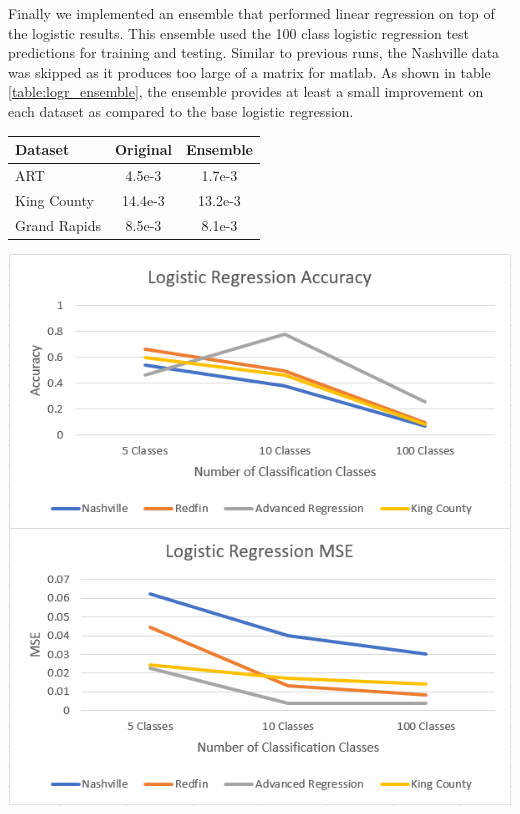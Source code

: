 \documentclass[10pt]{article}
\begin{document}
\begin{multicols}{2}
		Finally we implemented an ensemble that performed linear regression on top of the logistic results. This ensemble used the 100 class logistic regression test predictions for training and testing. Similar to previous runs, the Nashville data was skipped as it produces too large of a matrix for matlab. As shown in table \ref{table:logr_ensemble}, the ensemble provides at least a small improvement on each dataset as compared to the base logistic regression.

		\begin{center}
		\captionsetup{type=table}
		\begin{tabular}{l|c|c}
			Dataset			& Original & Ensemble \\
			\hline
			ART 			& 4.5e-3	& 1.7e-3 \\
			King County 	& 14.4e-3 	& 13.2e-3 \\
			Grand Rapids	& 8.5e-3 	& 8.1e-3 \\
		\end{tabular}
		\label{table:logr_ensemble}
		\end{center}

		\begin{center}
	        \captionsetup{type=figure}
			\includegraphics[scale=0.6]{Images/LogisticRegressionMSEAccuracy} \\
			\label{fig:logr_MSE_Accuracy}
		\end{center}
			

\end{multicols}
\end{document}
